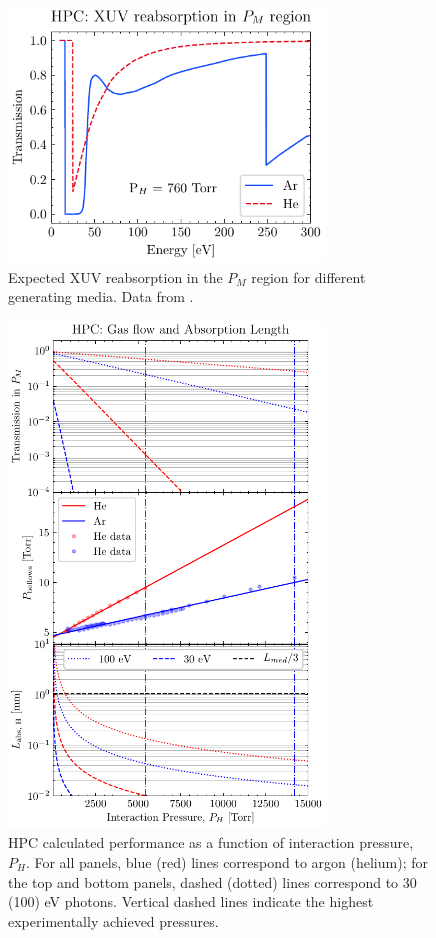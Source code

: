 \begin{figure}
	\centering
	\includegraphics[width=0.75\textwidth]{figures/chap3/HPC_absorption.pdf}
	\caption{Expected XUV reabsorption in the $P_M$ region for different generating media. Data from \cite{gulliksonCXROXRayInteractions}.}
	\label{fig:HPC_absorption}
\end{figure}

\begin{figure}
	\centering
	\includegraphics[width=0.75\textwidth]{figures/chap3/HPC-gas-flow-int-length.pdf}
	\caption{HPC calculated performance as a function of interaction pressure, $P_H$. For all panels, blue (red) lines correspond to argon (helium); for the top and bottom panels, dashed (dotted) lines correspond to 30 (100) eV photons. Vertical dashed lines indicate the highest experimentally achieved pressures.}
	\label{fig:HPC-gas-flow-int-length}
\end{figure}

